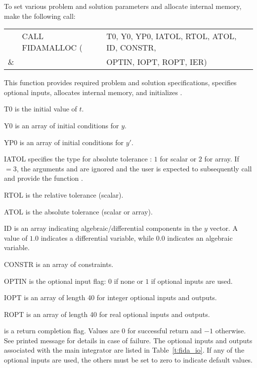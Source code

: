 \begin{Steps}
  To set various problem and solution parameters and allocate
  internal memory, make the following call:
  {
    \begin{tabular}[t]{@{}r@{}l@{}l}
        &CALL FIDAMALLOC (&T0, Y0, YP0, IATOL, RTOL, ATOL, ID, CONSTR, \\
    {\&}&                 &OPTIN, IOPT, ROPT, IER)
    \end{tabular}
  }
  {
    This function provides required problem and solution specifications, 
    specifies optional inputs,
    allocates internal memory, and initializes {\ida}.
  }
  {
    \begin{args}[CONSTR]
    \item[T0] is the initial value of $t$.
    \item[Y0] is an array of initial conditions for $y$.
    \item[YP0] is an array of initial conditions for $y'$.
    \item[IATOL] specifies the type for absolute tolerance :
      $1$ for scalar or $2$ for array. If $=3$, the arguments
       and  are ignored and the user is expected to
      subsequently call  and provide the function .
    \item[RTOL] is the relative tolerance (scalar).
    \item[ATOL] is the absolute tolerance (scalar or array).
    \item[ID] is an array indicating algebraic/differential components in the
      $y$ vector. A value of $1.0$ indicates a differential variable, while
      $0.0$ indicates an algebraic variable.
    \item[CONSTR] is an array of constraints.
    \item[OPTIN] is the optional input flag: $0$ if none or $1$ if optional 
      inputs are used.
    \item[IOPT] is an array of length 40 for integer optional inputs and outputs.
    \item[ROPT] is an array of length 40 for real optional inputs and outputs.
    \end{args}
  }
  {
     is a return completion flag.  Values are $0$ for successful return
    and $-1$ otherwise. See printed message for details in case of failure.
  }
  {
    The optional inputs and outputs associated with the main {\ida} integrator
    are listed in Table~\ref{t:fida_io}.
    If any of the optional inputs are used, the others must be set
    to zero to indicate default values.
  }


\end{Steps}
